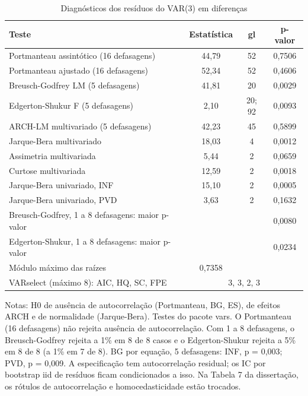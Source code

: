 \begin{table}[htbp]
\centering
\caption{Diagn\'osticos dos res\'iduos do VAR(3) em diferen\c{c}as}
\label{tab:a1_diagnosticos}
\small
\begin{tabular}{lccc}
\toprule
Teste & Estat\'istica & gl & p-valor \\
\midrule
Portmanteau assint\'otico (16 defasagens) & 44{,}79 & 52 & 0{,}7506 \\
Portmanteau ajustado (16 defasagens) & 52{,}34 & 52 & 0{,}4606 \\
Breusch-Godfrey LM (5 defasagens) & 41{,}81 & 20 & 0{,}0029 \\
Edgerton-Shukur F (5 defasagens) & 2{,}10 & 20; 92 & 0{,}0093 \\
ARCH-LM multivariado (5 defasagens) & 42{,}23 & 45 & 0{,}5899 \\
Jarque-Bera multivariado & 18{,}03 & 4 & 0{,}0012 \\
Assimetria multivariada & 5{,}44 & 2 & 0{,}0659 \\
Curtose multivariada & 12{,}59 & 2 & 0{,}0018 \\
Jarque-Bera univariado, INF & 15{,}10 & 2 & 0{,}0005 \\
Jarque-Bera univariado, PVD & 3{,}63 & 2 & 0{,}1632 \\
\midrule
Breusch-Godfrey, 1 a 8 defasagens: maior p-valor & & & 0{,}0080 \\
Edgerton-Shukur, 1 a 8 defasagens: maior p-valor & & & 0{,}0234 \\
\midrule
M\'odulo m\'aximo das ra\'izes & 0{,}7358 & & \\
VARselect (m\'aximo 8): AIC, HQ, SC, FPE & \multicolumn{3}{c}{3, 3, 2, 3} \\
\bottomrule
\end{tabular}
\begin{minipage}{0.95\linewidth}\footnotesize
\medskip Notas: H0 de aus\^encia de autocorrela\c{c}\~ao (Portmanteau, BG, ES), de efeitos ARCH e de normalidade (Jarque-Bera). Testes do pacote vars. O Portmanteau (16 defasagens) n\~ao rejeita aus\^encia de autocorrela\c{c}\~ao. Com 1 a 8 defasagens, o Breusch-Godfrey rejeita a 1\% em 8 de 8 casos e o Edgerton-Shukur rejeita a 5\% em 8 de 8 (a 1\% em 7 de 8). BG por equa\c{c}\~ao, 5 defasagens: INF, p = 0{,}003; PVD, p = 0{,}009. A especifica\c{c}\~ao tem autocorrela\c{c}\~ao residual; os IC por bootstrap iid de res\'iduos ficam condicionados a isso. Na Tabela 7 da disserta\c{c}\~ao, os r\'otulos de autocorrela\c{c}\~ao e homocedasticidade est\~ao trocados.
\end{minipage}
\end{table}
